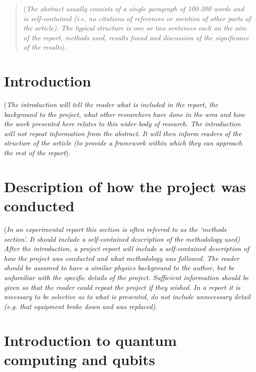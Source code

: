 \documentclass{physics_article_B}
\date{}
\begin{document}
\maketitle
\newpage

\begin{abstract}
(\emph{The abstract usually consists of a single paragraph of 100-200 words and is self-contained (i.e. no citations of references or mention of other parts of the article). The typical structure is one or two sentences each on the aim of the report, methods used, results found and discussion of the significance of the results}).
\end{abstract}

\tableofcontents
\newpage

\section{Introduction\label{intro}}
(\emph{The introduction will tell the reader what is included in the report, the background to the project, what other researchers have done in the area and how the work presented here relates to this wider body of research. The introduction will not repeat information from the abstract. It will then inform readers of the structure of the article (to provide a framework within which they can approach the rest of the report}). 

\section{Description of how the project was conducted\label{method}}
(\emph{In an experimental report this section is often referred to as the ‘methods section’. It should include a self-contained description of the methodology used) After the introduction, a project report will include a self-contained description of how the project was conducted and what methodology was followed. The reader should be assumed to have a similar physics background to the author, but be unfamiliar with the specific details of the project. Sufficient information should be given so that the reader could repeat the project if they wished. In a report it is necessary to be selective as to what is presented, do not include unnecessary detail (e.g. that equipment broke down and was replaced)}.

\section{Introduction to quantum computing and qubits}
\label{introduction_to_quantum_computing_and_qubits}
\end{document}

